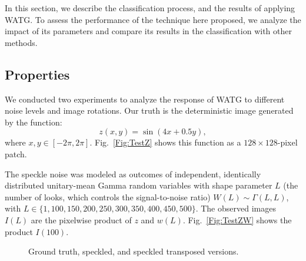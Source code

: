 In this section, we describe  the classification process, and 
the results of applying WATG.
To assess the performance of the technique here proposed, we analyze the impact of its parameters and compare its results in the classification with other methods.

\subsection{Properties}\label{Sec:WATGProperties}

We conducted two experiments to analyze the response of WATG to different noise levels and image rotations.
Our truth is the deterministic image generated by the function:
\begin{equation*}
z(x,y) = \sin (4x + 0.5y), 
\end{equation*}
where  $x, y \in [-2\pi, 2\pi]$.
Fig.~\ref{Fig:TestZ} shows this function as a $128\times128$-pixel patch.

The speckle noise was modeled as outcomes of independent, identically distributed unitary-mean Gamma random variables with shape parameter $L$ (the number of looks, which controls the signal-to-noise ratio)
$W(L) \sim \Gamma(L, L)$,
with $L \in \{1, 100, 150, 200, 250, 300, 350, 400, 450, 500\}$.
The observed images $I(L)$ are the pixelwise product of $z$ and $w(L)$.
Fig.~\ref{Fig:TestZW} shows the product $I(100)$.

\begin{figure}
	\centering
	\caption{Ground truth, speckled, and speckled transposed versions.}
	\label{Fig:TestZWL}
\end{figure}

